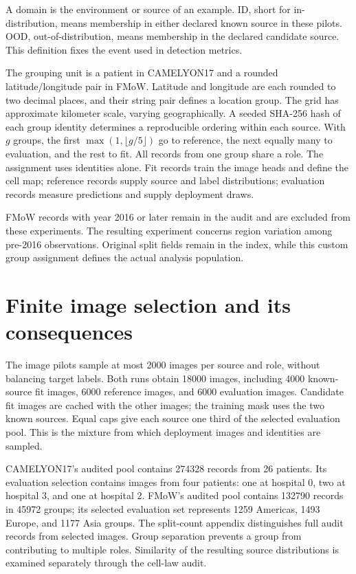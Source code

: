 \documentclass[11pt,a4paper]{report}
\begin{document}
A domain is the environment or source of an example. ID, short for in-distribution, means membership in either declared known source in these pilots. OOD, out-of-distribution, means membership in the declared candidate source. This definition fixes the event used in detection metrics.

The grouping unit is a patient in CAMELYON17 and a rounded latitude/longitude pair in FMoW. Latitude and longitude are each rounded to two decimal places, and their string pair defines a location group. The grid has approximate kilometer scale, varying geographically. A seeded SHA-256 hash of each group identity determines a reproducible ordering within each source. With $g$ groups, the first $\max(1,\lfloor g/5\rfloor)$ go to reference, the next equally many to evaluation, and the rest to fit. All records from one group share a role. The assignment uses identities alone. Fit records train the image heads and define the cell map; reference records supply source and label distributions; evaluation records measure predictions and supply deployment draws.

FMoW records with year 2016 or later remain in the audit and are excluded from these experiments. The resulting experiment concerns region variation among pre-2016 observations. Original split fields remain in the index, while this custom group assignment defines the actual analysis population.

\section{Finite image selection and its consequences}
The image pilots sample at most 2000 images per source and role, without balancing target labels. Both runs obtain 18000 images, including 4000 known-source fit images, 6000 reference images, and 6000 evaluation images. Candidate fit images are cached with the other images; the training mask uses the two known sources. Equal caps give each source one third of the selected evaluation pool. This is the mixture from which deployment images and identities are sampled.

CAMELYON17's audited pool contains 274328 records from 26 patients. Its evaluation selection contains images from four patients: one at hospital 0, two at hospital 3, and one at hospital 2. FMoW's audited pool contains 132790 records in 45972 groups; its selected evaluation set represents 1259 Americas, 1493 Europe, and 1177 Asia groups. The split-count appendix distinguishes full audit records from selected images. Group separation prevents a group from contributing to multiple roles. Similarity of the resulting source distributions is examined separately through the cell-law audit.
\end{document}
